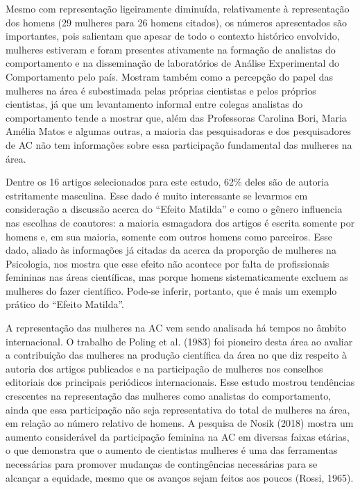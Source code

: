Mesmo com representação ligeiramente diminuída, relativamente à representação dos homens (29 mulheres para 26 homens citados), os números apresentados são importantes, pois salientam que apesar de todo o contexto histórico envolvido, mulheres estiveram e foram presentes ativamente na formação de analistas do comportamento e na disseminação de laboratórios de Análise Experimental do Comportamento pelo país. Mostram também como a percepção do papel das mulheres na área é subestimada pelas próprias cientistas e pelos próprios cientistas, já que um levantamento informal entre colegas analistas do comportamento tende a mostrar que, além das Professoras Carolina Bori, Maria Amélia Matos e algumas outras, a maioria das pesquisadoras e dos pesquisadores de AC não tem informações sobre essa participação fundamental das mulheres na área.

Dentre os 16 artigos selecionados para este estudo, 62\% deles são de autoria estritamente masculina. Esse dado é muito interessante se levarmos em consideração a discussão acerca do “Efeito Matilda” e como o gênero influencia nas escolhas de coautores: a maioria esmagadora dos artigos é escrita somente por homens e, em sua maioria, somente com outros homens como parceiros. Esse dado, aliado às informações já citadas da acerca da proporção de mulheres na Psicologia, nos mostra que esse efeito não acontece por falta de profissionais femininas nas áreas científicas, mas porque homens sistematicamente excluem as mulheres do fazer científico. Pode-se inferir, portanto, que é mais um exemplo prático do “Efeito Matilda”.

A representação das mulheres na AC vem sendo analisada há tempos no âmbito internacional. O trabalho de Poling et al. (1983) foi pioneiro desta área ao avaliar a contribuição das mulheres na produção científica da área no que diz respeito à autoria dos artigos publicados e na participação de mulheres nos conselhos editoriais dos principais periódicos internacionais. Esse estudo mostrou tendências crescentes na representação das mulheres como analistas do comportamento, ainda que essa participação não seja representativa do total de mulheres na área, em relação ao número relativo de homens. A pesquisa de Nosik (2018) mostra um aumento considerável da participação feminina na AC em diversas faixas etárias, o que demonstra que o aumento de cientistas mulheres é uma das ferramentas necessárias para promover mudanças de contingências necessárias para se alcançar a equidade, mesmo que os avanços sejam feitos aos poucos (Rossi, 1965).

